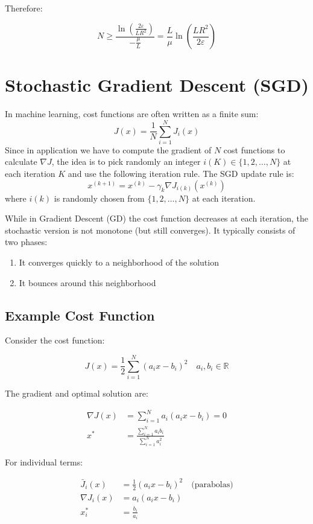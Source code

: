 Therefore:

\[
N \geq \frac{\ln\left(\frac{2\varepsilon}{LR^2}\right)}{-\frac{\mu}{L}} = \frac{L}{\mu}\ln\left(\frac{LR^2}{2\varepsilon}\right)
\]



\newpage
\section{Stochastic Gradient Descent (SGD)}

In machine learning, cost functions are often written as a finite sum:
\[
J(x) = \frac{1}{N}\sum_{i=1}^N J_i(x)
\]
Since in application we have to compute the gradient of $N$ cost functions to calculate $\nabla J$, the idea is to pick randomly an integer $i(K) \in\{1,2, \ldots, N\}$ at each iteration $K$ and use the following iteration rule.
The SGD update rule is:
\[
x^{(k+1)} = x^{(k)} - \gamma_k \nabla J_{i(k)}(x^{(k)})
\]
where $i(k)$ is randomly chosen from $\{1, 2, \ldots, N\}$ at each iteration.

While in Gradient Descent (GD) the cost function decreases at each iteration, the stochastic version is not monotone (but still converges). It typically consists of two phases:
\begin{enumerate}
    \item It converges quickly to a neighborhood of the solution
    \item It bounces around this neighborhood
\end{enumerate}

\subsection*{Example Cost Function}

Consider the cost function:

\[J(x) = \frac{1}{2} \sum_{i=1}^{N} (a_i x - b_i)^2 \quad a_i, b_i \in \mathbb{R}\]

The gradient and optimal solution are:

\begin{align*}
    \nabla J(x) &= \sum_{i=1}^{N} a_i(a_i x - b_i) = 0 \\
    x^* &= \frac{\sum_{i=1}^{N} a_i b_i}{\sum_{i=1}^{N} a_i^2}
\end{align*}

For individual terms:

\begin{align*}
    \bar{J}_i(x) &= \frac{1}{2}(a_i x - b_i)^2 \quad \text{(parabolas)} \\
    \nabla J_i(x) &= a_i(a_i x - b_i) \\
    x_i^* &= \frac{b_i}{a_i}
\end{align*}

